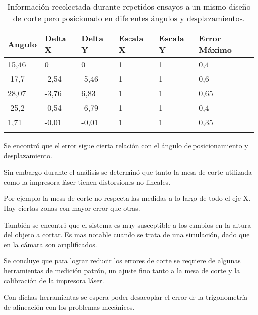       \begin{longtable}[!h]{m{}m{}m{}m{}m{}m{}}
            \caption[Ensayos de corte simulado]{Información recolectada durante repetidos ensayos a un mismo diseño de corte pero posicionado en diferentes ángulos y desplazamientos.}\\
            \toprule
               \textbf{Angulo} & \textbf{Delta X} & \textbf{Delta Y} & \textbf{Escala X} & \textbf{Escala Y} & \textbf{Error Máximo} \\ 
            \midrule
            \endfirsthead
            {15,46}& {0}&     {0}     & {1} & {1} & {0,4}\\
            {-17,7}& {-2,54}& {-5,46} & {1} & {1} & {0,6}\\
            {28,07}& {-3,76}& {6,83}  & {1} & {1} & {0,65}\\
            {-25,2}& {-0,54}& {-6,79} & {1} & {1} & {0,4}\\
            {1,71}&  {-0,01}& {-0,01} & {1} & {1} & {0,35}\\
               \bottomrule
            \label{tbl:ensayo_A}
         \end{longtable}

         Se encontró que el error sigue cierta relación con el ángulo de posicionamiento y desplazamiento.\par
      Sin embargo durante el análisis se determinó que tanto la mesa de corte utilizada como la impresora láser tienen distorsiones no lineales.\par
      Por ejemplo la mesa de corte no respecta las medidas a lo largo de todo el eje X. Hay ciertas zonas con mayor error que otras. \par
      También se encontró que el sistema es muy susceptible a los cambios en la altura del objeto a cortar. Es mas notable cuando se trata de una simulación, dado que en la cámara son amplificados.\par
      Se concluye que para lograr reducir los errores de corte se requiere de algunas herramientas de medición patrón, un ajuste fino tanto a la mesa de corte y la calibración de la impresora láser.\par
      Con dichas herramientas se espera poder desacoplar el error de la trigonometría de alineación con los problemas mecánicos.


